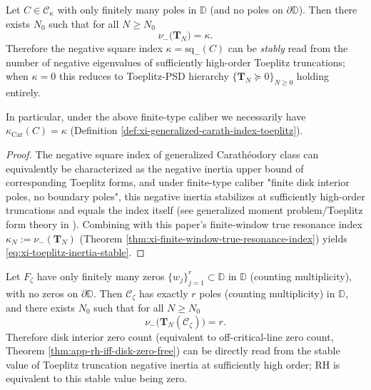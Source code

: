 \begin{theorem}\label{thm:xi-toeplitz-inertia-stabilizes-to-kappa}
Let \(C\in\mathcal{C}_{\kappa}\) with only finitely many poles in \(\mathbb{D}\) (and no poles on \(\partial\mathbb{D}\)).
Then there exists \(N_0\) such that for all \(N\ge N_0\)
\begin{equation}\label{eq:xi-toeplitz-inertia-stable}
\boxed{\;
\nu_-\!\bigl(\mathbf{T}_N\bigr)=\kappa. \;}
\end{equation}
Therefore the negative square index \(\kappa=\mathrm{sq}_-(C)\) can be \emph{stably} read from the number of negative eigenvalues of sufficiently high-order Toeplitz truncations;
when \(\kappa=0\) this reduces to Toeplitz-PSD hierarchy \(\{\mathbf{T}_N\succeq 0\}_{N\ge 0}\) holding entirely.
\par
In particular, under the above finite-type caliber we necessarily have \(\kappa_{\mathrm{Car}}(C)=\kappa\) (Definition \ref{def:xi-generalized-carath-index-toeplitz}).
\end{theorem}

\begin{proof}
The negative square index of generalized Carathéodory class can equivalently be characterized as the negative inertia upper bound of corresponding Toeplitz forms,
and under finite-type caliber "finite disk interior poles, no boundary poles", this negative inertia stabilizes at sufficiently high-order truncations and equals the index itself (see generalized moment problem/Toeplitz form theory in \cite{KreinLanger1977ExtensionPiKappaI,AlpayDijksmaRovnyakDeSnoo1997SchurPontryagin}).
Combining with this paper's finite-window true resonance index \(\kappa_N:=\nu_-(\mathbf{T}_N)\) (Theorem \ref{thm:xi-finite-window-true-resonance-index}) yields \eqref{eq:xi-toeplitz-inertia-stable}.
\end{proof}

\begin{corollary}\label{cor:xi-inertia-stable-counts-disk-zeros}
Let \(F_{\zeta}\) have only finitely many zeros \(\{w_j\}_{j=1}^{r}\subset\mathbb{D}\) in \(\mathbb{D}\) (counting multiplicity), with no zeros on \(\partial\mathbb{D}\).
Then \(\mathscr{C}_{\zeta}\) has exactly \(r\) poles (counting multiplicity) in \(\mathbb{D}\), and there exists \(N_0\) such that for all \(N\ge N_0\)
\[
\boxed{\;
\nu_-\!\bigl(\mathbf{T}_N(\mathscr{C}_{\zeta})\bigr)=r. \;}
\]
Therefore disk interior zero count (equivalent to off-critical-line zero count, Theorem \ref{thm:app-rh-iff-disk-zero-free}) can be directly read from the stable value of Toeplitz truncation negative inertia at sufficiently high order; RH is equivalent to this stable value being zero.
\end{corollary}

